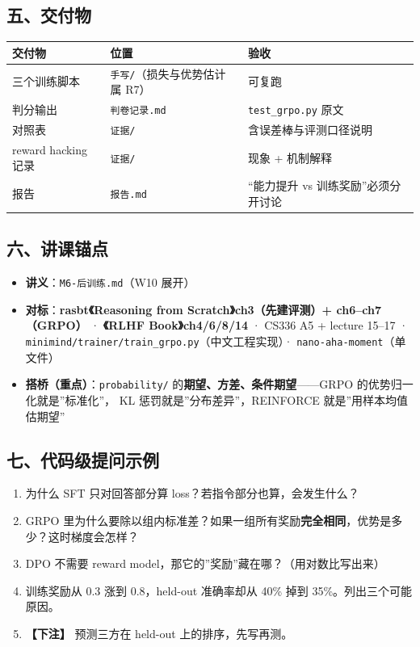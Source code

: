 \documentclass[
  chinese,
  11pt,
]{ctexart}
\newcounter{none} %
\providecommand{\tightlist}{%
  \setlength{\itemsep}{0pt}\setlength{\parskip}{0pt}}
\begin{document}
\subsection{五、交付物}\label{ux4e94ux4ea4ux4ed8ux7269-6}

{\def\LTcaptype{none} %
\begin{longtable}[]{@{}lll@{}}
\toprule\noalign{}
交付物 & 位置 & 验收 \\
\midrule\noalign{}
\endhead
\bottomrule\noalign{}
\endlastfoot
三个训练脚本 & \texttt{手写/}（损失与优势估计属 R7） & 可复跑 \\
判分输出 & \texttt{判卷记录.md} & \texttt{test\_grpo.py} 原文 \\
对照表 & \texttt{证据/} & 含误差棒与评测口径说明 \\
reward hacking 记录 & \texttt{证据/} & 现象 + 机制解释 \\
报告 & \texttt{报告.md} & ``能力提升 vs 训练奖励''必须分开讨论 \\
\end{longtable}
}

\subsection{六、讲课锚点}\label{ux516dux8bb2ux8bfeux951aux70b9-5}

\begin{itemize}
\tightlist
\item
  \textbf{讲义}：\texttt{M6-后训练.md}（W10 展开）
\item
  \textbf{对标}：\textbf{rasbt《Reasoning from Scratch》ch3（先建评测）+ ch6--ch7（GRPO）} · \textbf{《RLHF Book》ch4/6/8/14} · CS336 A5 + lecture 15--17 · \texttt{minimind/trainer/train\_grpo.py}（中文工程实现）· \texttt{nano-aha-moment}（单文件）
\item
  \textbf{搭桥（重点）}：\texttt{probability/} 的\textbf{期望、方差、条件期望}------GRPO 的优势归一化就是''标准化''， KL 惩罚就是''分布差异''，REINFORCE 就是''用样本均值估期望''
\end{itemize}

\subsection{七、代码级提问示例}\label{ux4e03ux4ee3ux7801ux7ea7ux63d0ux95eeux793aux4f8b-5}

\begin{enumerate}
\def\labelenumi{\arabic{enumi}.}
\tightlist
\item
  为什么 SFT 只对回答部分算 loss？若指令部分也算，会发生什么？
\item
  GRPO 里为什么要除以组内标准差？如果一组所有奖励\textbf{完全相同}，优势是多少？这时梯度会怎样？
\item
  DPO 不需要 reward model，那它的''奖励''藏在哪？（用对数比写出来）
\item
  训练奖励从 0.3 涨到 0.8，held-out 准确率却从 40\% 掉到 35\%。列出三个可能原因。
\item
  \textbf{【下注】} 预测三方在 held-out 上的排序，先写再测。
\end{enumerate}
\end{document}
